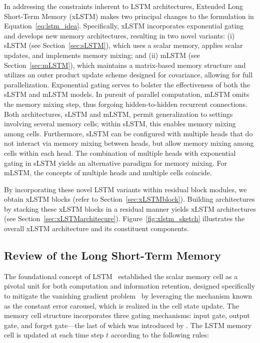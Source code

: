In addressing the constraints inherent to LSTM architectures, Extended Long Short-Term Memory (xLSTM) makes two principal changes to the formulation in Equation~\eqref{eq:lstm_idea}. Specifically, xLSTM incorporates exponential gating and develops new memory architectures, resulting in two novel variants: (i) sLSTM (see Section~\ref{sec:sLSTM}), which uses a scalar memory, applies scalar updates, and implements memory mixing; and (ii) mLSTM (see Section~\ref{sec:mLSTM}), which maintains a matrix-based memory structure and utilizes an outer product update scheme designed for covariance, allowing for full parallelization. Exponential gating serves to bolster the effectiveness of both the sLSTM and mLSTM models. In pursuit of parallel computation, mLSTM omits the memory mixing step, thus forgoing hidden-to-hidden recurrent connections. Both architectures, sLSTM and mLSTM, permit generalization to settings involving several memory cells; within sLSTM, this enables memory mixing among cells. Furthermore, sLSTM can be configured with multiple heads that do not interact via memory mixing between heads, but allow memory mixing among cells within each head. The combination of multiple heads with exponential gating in sLSTM yields an alternative paradigm for memory mixing. For mLSTM, the concepts of multiple heads and multiple cells coincide.

By incorporating these novel LSTM variants within residual block modules, we obtain xLSTM blocks (refer to Section~\ref{sec:xLSTMblock}). Building architectures by stacking these xLSTM blocks in a residual manner yields xLSTM architectures (see Section~\ref{sec:xLSTMarchitecure}). Figure~\ref{fig:xlstm_sketch} illustrates the overall xLSTM architecture and its constituent components.

\subsection{Review of the Long Short-Term Memory}
\label{sec:orgLSTM}

The foundational concept of LSTM~\citep{Hochreiter:91,Hochreiter:97nips,Hochreiter:97} established the scalar memory cell as a pivotal unit for both computation and information retention, designed specifically to mitigate the vanishing gradient problem~\citep{Hochreiter:91,Hochreiter:00book} by leveraging the mechanism known as the constant error carousel, which is realized in the cell state update. The memory cell structure incorporates three gating mechanisms: input gate, output gate, and forget gate—the last of which was introduced by \citet{Gers:00}. 
The LSTM memory cell is updated at each time step $t$ according to the following rules:

